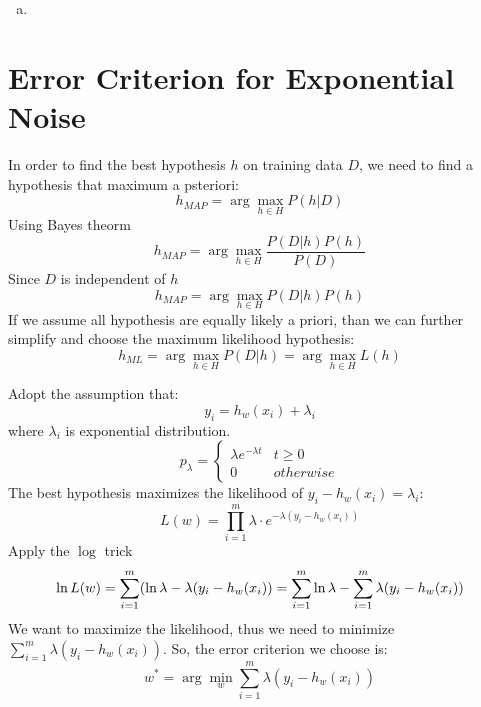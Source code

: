 \documentclass[a4paper, 12pt, titlepage]{article}
\begin{document}
\begin{enumerate}[(a)]
\begin{enumerate}[(a)]
        \item

\end{enumerate}
\section{Error Criterion for Exponential Noise}

In order to find the best hypothesis $h$ on training data $D$, we need to find a hypothesis that maximum a psteriori:
$$h_{MAP}=\arg\max_{h\in{}H}P(h|D)$$
Using Bayes theorm
$$h_{MAP}=\arg\max_{h\in{}H}\frac{P(D|h)P(h)}{P(D)}$$
Since $D$ is independent of $h$
$$h_{MAP}=\arg\max_{h\in{}H}P(D|h)P(h)$$
If we assume all hypothesis are equally likely a priori, than we can further simplify and choose the maximum likelihood hypothesis:
$$h_{ML}=\arg\max_{h\in{}H}P(D|h)=\arg\max_{h\in{}H}L(h)$$

Adopt the assumption that:
$$y_i=h_w(x_i)+\lambda_i$$
where $\lambda_i$ is exponential distribution.
$$
    p_\lambda=\begin{cases}
        \lambda{}e^{-\lambda{}t}&t\geq0 \\
        0&otherwise
    \end{cases}
$$
The best hypothesis maximizes the likelihood of $y_i-h_w(x_i)=\lambda_i$:
$$L(w)=\prod_{i=1}^m\lambda\cdot{}e^{-\lambda(y_i-h_w(x_i))}$$
Apply the $\log$ trick
$$\ln{}L(w)=\sum^m_{i=1}(\ln\lambda-\lambda(y_i-h_w(x_i))\\
=\sum^m_{i=1}\ln\lambda-\sum^m_{i=1}\lambda(y_i-h_w(x_i))$$
We want to maximize the likelihood, thus we need to minimize $\sum^m_{i=1}\lambda(y_i-h_w(x_i))$. So, the error criterion we choose is:
$$w^*=\arg\min_w\sum^m_{i=1}\lambda(y_i-h_w(x_i))$$


\end{enumerate}
\end{document}
